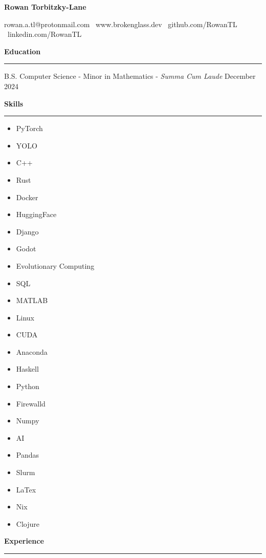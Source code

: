 \documentclass[11pt]{article}
\begin{document}
\begin{center}
    \textbf{\huge Rowan Torbitzky-Lane}\\
    \hrulefill
\end{center}

\begin{center}
    rowan.a.tl@protonmail.com \textbullet \ www.brokenglass.dev \textbullet \ github.com/RowanTL \textbullet  \ linkedin.com/RowanTL
\end{center}

\textbf{Education}\par
\vspace{-12pt}
\noindent\rule{\textwidth}{0.4pt}

B.S. Computer Science - Minor in Mathematics - \textit{Summa Cum Laude} \hfill December 2024

\textbf{Skills}\par
\vspace{-12pt}
\noindent\rule{\textwidth}{0.4pt}
\vspace{-24pt}  %
\begin{multicols}{3}
    \begin{itemize}[noitemsep, topsep=0pt, partopsep=0pt, parsep=0pt, itemsep=0pt]
        \small
        \item PyTorch
        \item YOLO
        \item C++
        \item Rust
        \item Docker
        \item HuggingFace
        \item Django
        \item Godot
        \item Evolutionary Computing
        \item SQL
        \item MATLAB
        \item Linux
        \item CUDA
        \item Anaconda
        \item Haskell
        \item Python
        \item Firewalld
        \item Numpy
        \item AI
        \item Pandas
        \item Slurm
        \item LaTex
        \item Nix
        \item Clojure
    \end{itemize}
\end{multicols}
\vspace{-10pt}  %
\textbf{Experience}\par
\vspace{-12pt}
\noindent\rule{\textwidth}{0.4pt}
\end{document}
